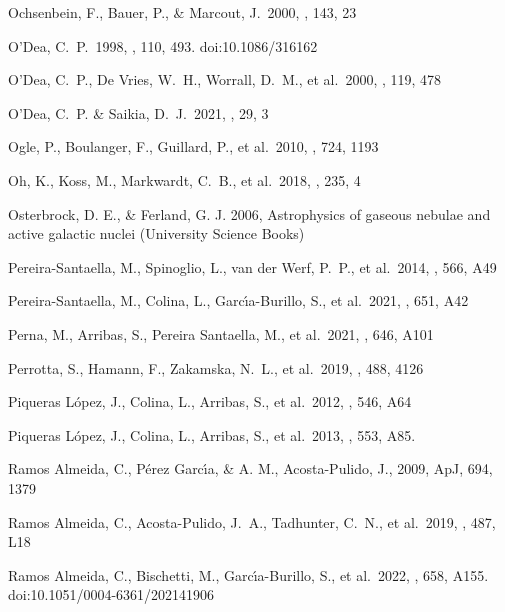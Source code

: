 \documentclass{aa}
\begin{document}
\begin{thebibliography}
 Ochsenbein, F., Bauer, P., \& Marcout, J.\ 2000, \aaps, 143, 23



 O'Dea, C.~P.\ 1998, \pasp, 110, 493. doi:10.1086/316162

 O'Dea, C.~P., De Vries, W.~H., Worrall, D.~M., et al.\ 2000, \aj, 119, 478


 O'Dea, C.~P. \& Saikia, D.~J.\ 2021, \aapr, 29, 3

 Ogle, P., Boulanger, F., Guillard, P., et al.\ 2010, \apj, 724, 1193

 Oh, K., Koss, M., Markwardt, C.~B., et al.\ 2018, \apjs, 235, 4

 Osterbrock, D. E., \& Ferland, G. J. 2006, Astrophysics of gaseous nebulae and active galactic nuclei (University Science Books) 

 Pereira-Santaella, M., Spinoglio, L., van der Werf, P.~P., et al.\ 2014, \aap, 566, A49

 Pereira-Santaella, M., Colina, L., Garc{\'\i}a-Burillo, S., et al.\ 2021, \aap, 651, A42

 Perna, M., Arribas, S., Pereira Santaella, M., et al.\ 2021, \aap, 646, A101

 Perrotta, S., Hamann, F., Zakamska, N.~L., et al.\ 2019, \mnras, 488, 4126

 Piqueras L{\'o}pez, J., Colina, L., Arribas, S., et al.\ 2012, \aap, 546, A64

 Piqueras L{\'o}pez, J., Colina, L., Arribas, S., et al.\ 2013, \aap, 553, A85.

Ramos Almeida, C., P\'erez Garc\'\i a, \&  A. M., Acosta-Pulido, J., 2009, ApJ, 694, 1379

 Ramos Almeida, C., Acosta-Pulido, J.~A., Tadhunter, C.~N., et al.\ 2019, \mnras, 487, L18

 Ramos Almeida, C., Bischetti, M., Garc{\'\i}a-Burillo, S., et al.\ 2022, \aap, 658, A155. doi:10.1051/0004-6361/202141906


\end{thebibliography}
\end{document}
